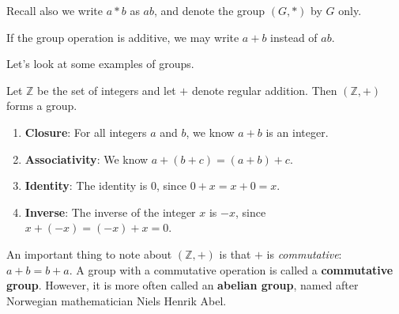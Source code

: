 Recall also we write $a \ast b$ as $ab$, and denote the group $(G, \ast)$ by $G$ only.

\begin{remark}
    If the group operation is additive, we may write $a + b$ instead of $ab$.
\end{remark}

Let's look at some examples of groups.

\newpage

\begin{example}
    Let $\mathbb{Z}$ be the set of integers and let $+$ denote regular addition. Then $(\mathbb{Z}, +)$ forms a group.
    \begin{enumerate}
        \item \textbf{Closure}: For all integers $a$ and $b$, we know $a + b$ is an integer.
        \item \textbf{Associativity}: We know $a + (b + c) = (a + b) + c$.
        \item \textbf{Identity}: The identity is 0, since $0 + x = x + 0 = x$.
        \item \textbf{Inverse}: The inverse of the integer $x$ is $-x$, since $x + (-x) = (-x) + x = 0$.
    \end{enumerate}
\end{example}

An important thing to note about $(\mathbb{Z}, +)$ is that $+$ is \textit{commutative}: $a + b = b + a$. A group with a commutative operation is called a \textbf{commutative group}. However, it is more often called an \textbf{abelian group}, named after Norwegian mathematician Niels Henrik Abel.

